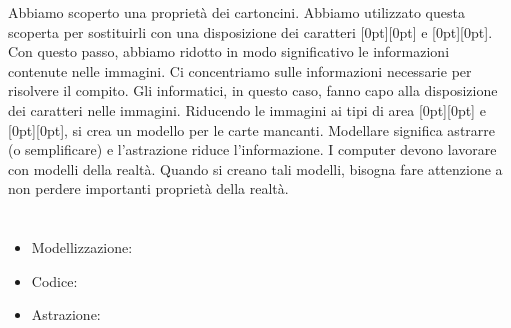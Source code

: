{{Abbiamo scoperto una proprietà dei cartoncini. Abbiamo utilizzato questa scoperta per sostituirli con una disposizione dei caratteri \raisebox{-0.5ex}[0pt][0pt]{} e \raisebox{-0.5ex}[0pt][0pt]{}. Con questo passo, abbiamo ridotto in modo significativo le informazioni contenute nelle immagini. Ci concentriamo sulle informazioni necessarie per risolvere il compito. Gli informatici, in questo caso, fanno capo alla disposizione dei caratteri nelle immagini. Riducendo le immagini ai tipi di area \raisebox{-0.5ex}[0pt][0pt]{} e \raisebox{-0.5ex}[0pt][0pt]{}, si crea un modello per le carte mancanti. Modellare significa astrarre (o semplificare) e l’astrazione riduce l’informazione. I computer devono lavorare con modelli della realtà. Quando si creano tali modelli, bisogna fare attenzione a non perdere importanti proprietà della realtà.



\section*{\BrochureWebsitesAndKeywords}
{\raggedright
\begin{itemize}
  \item Modellizzazione: \href{https://it.wikipedia.org/wiki/Modellizzazione}{}
  \item Codice: \href{https://it.wikipedia.org/wiki/Codice_(teoria_dell\%27informazione)}{}
  \item Astrazione: \href{https://it.wikipedia.org/wiki/Astrazione_(informatica)}{}
\end{itemize}


}

}{}

}
